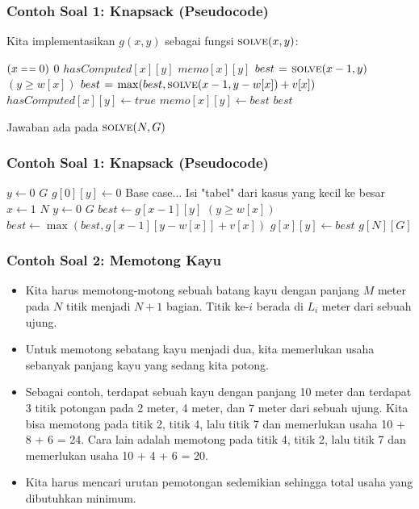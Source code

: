 \begin{frame}
\frametitle{Contoh Soal 1: Knapsack (Pseudocode)}
Kita implementasikan $g(x, y)$ sebagai fungsi $\textnormal{\scshape solve}(x,y)$:
\begin{codebox}
\li \If $(x \isequal 0)$ \Then
\li   \Return $0$
\li \ElseIf $hasComputed[x][y]$ \Then
\li   \Return $memo[x][y]$ 
\li \Else
\li   $best \mathrel{\hspace{1pt}=\hspace{1pt}} \textnormal{\scshape solve}(x-1, y)$
\li   \If $(y \geq w[x])$ \Then
\li     $best \mathrel{\hspace{1pt}=\hspace{1pt}} \max(best, \textnormal{\scshape solve}(x - 1, y-w[x]) + v[x])$
      \End  
\li   $hasComputed[x][y] \gets true$
\li   $memo[x][y] \gets best$
\li   \Return $best$
    \End
\end{codebox}

Jawaban ada pada $\textnormal{\scshape solve}(N, G)$
\end{frame}

\begin{frame}
\frametitle{Contoh Soal 1: Knapsack (Pseudocode)}
\begin{codebox}
\li \For $y \gets 0$ \To $G$ \Do
\li   $g[0][y] \gets 0$ \Comment Base case...
    \End
\zi
\li \Comment Isi "tabel" dari kasus yang kecil ke besar
\li \For $x \gets 1$ \To $N$ \Do
\li   \For $y \gets 0$ \To $G$ \Do
\li     $best \gets g[x-1][y]$
\li     \If $(y \geq w[x])$ \Then
\li       $best \gets \max(best, g[x - 1][y-w[x]] + v[x])$
        \End  
\li     $g[x][y] \gets best$
      \End
    \End    
\li \Return $g[N][G]$
    \End
\end{codebox}
\end{frame}

\begin{frame}
\frametitle{Contoh Soal 2: Memotong Kayu}
\begin{itemize}
  \item Kita harus memotong-motong sebuah batang kayu dengan panjang $M$ meter pada $N$ titik menjadi $N+1$ bagian. Titik ke-$i$ berada di $L_i$ meter dari sebuah ujung.
  \item Untuk memotong sebatang kayu menjadi dua, kita memerlukan usaha sebanyak panjang kayu yang sedang kita potong.
  \item Sebagai contoh, terdapat sebuah kayu dengan panjang 10 meter dan terdapat 3 titik potongan pada 2 meter, 4 meter, dan 7 meter dari sebuah ujung. Kita bisa memotong pada titik 2, titik 4, lalu titik 7 dan memerlukan usaha 10 + 8 + 6 = 24. Cara lain adalah memotong pada titik 4, titik 2, lalu titik 7 dan memerlukan usaha 10 + 4 + 6 = 20.
  \item Kita harus mencari urutan pemotongan sedemikian sehingga total usaha yang dibutuhkan minimum.
\end{itemize}
\end{frame}

